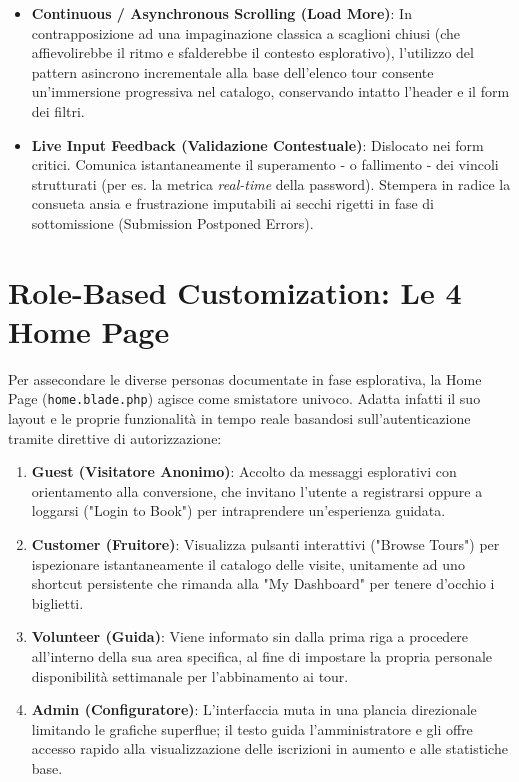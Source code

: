 \begin{itemize}
    \item \textbf{Continuous / Asynchronous Scrolling (Load More)}: In contrapposizione ad una impaginazione classica a scaglioni chiusi (che affievolirebbe il ritmo e sfalderebbe il contesto esplorativo), l'utilizzo del pattern asincrono incrementale alla base dell'elenco tour consente un'immersione progressiva nel catalogo, conservando intatto l'header e il form dei filtri.
    \item \textbf{Live Input Feedback (Validazione Contestuale)}: Dislocato nei form critici. Comunica istantaneamente il superamento - o fallimento - dei vincoli strutturati (per es. la metrica \textit{real-time} della password). Stempera in radice la consueta ansia e frustrazione imputabili ai secchi rigetti in fase di sottomissione (Submission Postponed Errors). 
\end{itemize}

\section{Role-Based Customization: Le 4 Home Page}
Per assecondare le diverse personas documentate in fase esplorativa, la Home Page (\texttt{home.blade.php}) agisce come smistatore univoco. Adatta infatti il suo layout e le proprie funzionalità in tempo reale basandosi sull'autenticazione tramite direttive di autorizzazione:
\begin{enumerate}
    \item \textbf{Guest (Visitatore Anonimo)}: Accolto da messaggi esplorativi con orientamento alla conversione, che invitano l'utente a registrarsi oppure a loggarsi ("Login to Book") per intraprendere un'esperienza guidata.
    \item \textbf{Customer (Fruitore)}: Visualizza pulsanti interattivi ("Browse Tours") per ispezionare istantaneamente il catalogo delle visite, unitamente ad uno shortcut persistente che rimanda alla "My Dashboard" per tenere d'occhio i biglietti.
    \item \textbf{Volunteer (Guida)}: Viene informato sin dalla prima riga a procedere all'interno della sua area specifica, al fine di impostare la propria personale disponibilità settimanale per l'abbinamento ai tour.
    \item \textbf{Admin (Configuratore)}: L'interfaccia muta in una plancia direzionale limitando le grafiche superflue; il testo guida l'amministratore e gli offre accesso rapido alla visualizzazione delle iscrizioni in aumento e alle statistiche base.
\end{enumerate}

